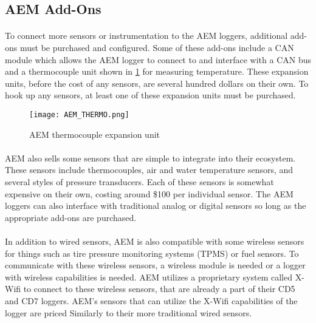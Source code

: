 \subsection{AEM Add-Ons}

\paragraph{}
To connect more sensors or instrumentation to the AEM loggers, additional add-ons must be purchased and configured.
Some of these add-ons include a CAN module which allows the AEM logger to connect to and interface with a CAN bus and a thermocouple unit shown in \cref{fig:AEM_THERMO} for measuring temperature.
These expansion units, before the cost of any sensors, are several hundred dollars on their own.
To hook up any sensors, at least one of these expansion units must be purchased.

\begin{figure}[H]
	\centering
	\texttt{[image: AEM\_THERMO.png]}
	\caption{AEM thermocouple expansion unit}
	\label{fig:AEM_THERMO}
\end{figure}

\paragraph{}
AEM also sells some sensors that are simple to integrate into their ecosystem.
These sensors include thermocouples, air and water temperature sensors, and several styles of pressure transducers.
Each of these sensors is somewhat expensive on their own, costing around \$100 per individual sensor.
The AEM loggers can also interface with traditional analog or digital sensors so long as the appropriate add-ons are purchased.

\paragraph{}
In addition to wired sensors, AEM is also compatible with some wireless sensors for things such as tire pressure monitoring systems (TPMS) or fuel sensors.
To communicate with these wireless sensors, a wireless module is needed or a logger with wireless capabilities is needed.
AEM utilizes a proprietary system called X-Wifi to connect to these wireless sensors, that are already a part of their CD5 and CD7 loggers.
AEM's sensors that can utilize the X-Wifi capabilities of the logger are priced Similarly to their more traditional wired sensors.

